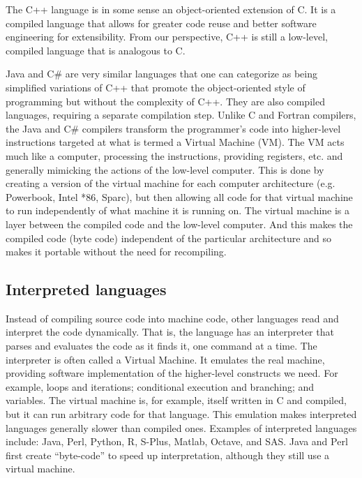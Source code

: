 The C++ language is in some sense an object-oriented extension of
C. It is a compiled language that allows for greater code reuse and
better software engineering for extensibility.  From our perspective,
C++ is still a low-level, compiled language that is analogous to C.

Java and C\# are very similar languages that one can categorize as
being simplified variations of C++ that promote the object-oriented
style of programming but without the complexity of C++.  They are also
compiled languages, requiring a separate compilation step.  Unlike C
and Fortran compilers, the Java and C\# compilers transform the
programmer's code into higher-level instructions targeted at what is
termed a Virtual Machine (VM).  The VM acts much like a computer,
processing the instructions, providing registers, etc. and generally
mimicking the actions of the low-level computer. This is done by
creating a version of the virtual machine for each computer
architecture (e.g. Powerbook, Intel *86, Sparc), but then allowing all
code for that virtual machine to run independently of what machine it
is running on. The virtual machine is a layer between the compiled
code and the low-level computer. And this makes the compiled code
(byte code) independent of the particular architecture and so makes it
portable without the need for recompiling.


\subsection{Interpreted languages}
Instead of compiling source code into machine code, other languages
read and interpret the code dynamically.  That is, the language has an
interpreter that parses and evaluates the code as it finds it, one
command at a time.  The interpreter is often called a Virtual
Machine. It emulates the real machine, providing software
implementation of the higher-level constructs we need.  For example,
loops and iterations; conditional execution and branching; and
variables.  The virtual machine is, for example, itself written in C
and compiled, but it can run arbitrary code for that language.  This
emulation makes interpreted languages generally slower than compiled
ones. Examples of interpreted languages include: Java, Perl, Python,
R, S-Plus, Matlab, Octave, and SAS. Java and Perl first create
``byte-code'' to speed up interpretation, although they still use a
virtual machine.

